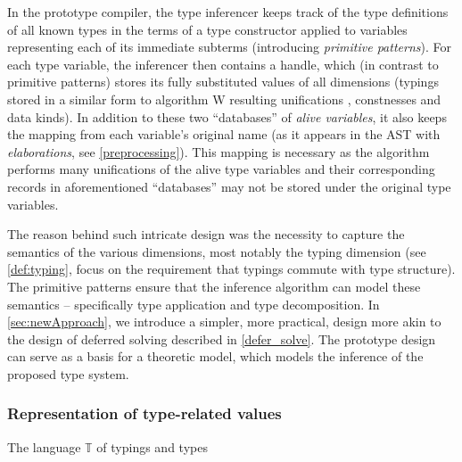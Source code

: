 In the prototype compiler, the type inferencer keeps track of the type definitions of all known types in the terms of a type constructor applied to variables representing each of its immediate subterms (introducing \emph{primitive patterns}). For each type variable, the inferencer then contains a handle, which (in contrast to primitive patterns) stores its fully substituted values of all dimensions (typings stored in a similar form to algorithm W resulting unifications \cite{damas1982principal}, constnesses and data kinds). In addition to these two ``databases'' of \emph{alive variables}, it also keeps the mapping from each variable's original name (as it appears in the AST with \emph{elaborations}, see \cref{preprocessing}). This mapping is necessary as the algorithm performs many unifications of the alive type variables and their corresponding records in aforementioned ``databases'' may not be stored under the original type variables.

The reason behind such intricate design was the necessity to capture the semantics of the various dimensions, most notably the typing dimension (see \cref{def:typing}, focus on the requirement that typings commute with type structure). The primitive patterns ensure that the inference algorithm can model these semantics -- specifically type application and type decomposition. In \cref{sec:newApproach}, we introduce a simpler, more practical, design more akin to the design of deferred solving described in \cref{defer_solve}. The prototype design can serve as a basis for a theoretic model, which models the inference of the proposed type system.

\subsubsection{Representation of type-related values}
\label{sec:repre}

\begin{lang}
  \def\grammarP{0.6}
  \begin{grammar}
  \end{grammar}
  \caption{The language $\mathbb{T}$ of typings and types}
  \label{lang:typing}
\end{lang}


